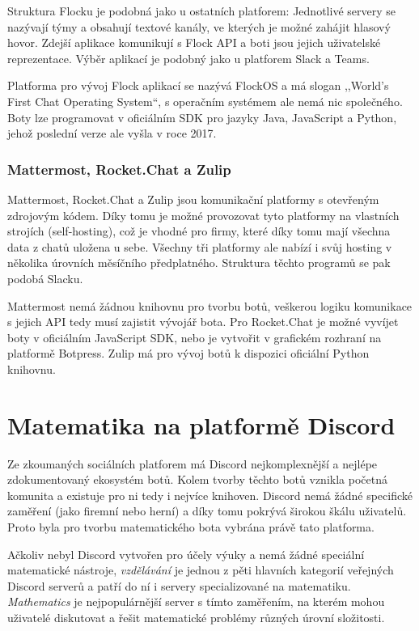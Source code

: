 \documentclass[FM]{tulthesis}
\begin{document}
	Struktura Flocku je podobná jako u ostatních platforem: Jednotlivé servery se nazývají týmy a obsahují textové kanály, ve kterých je možné zahájit hlasový hovor. Zdejší aplikace komunikují s Flock API a boti jsou jejich uživatelské reprezentace. Výběr aplikací je podobný jako u platforem Slack a Teams.
	
	Platforma pro vývoj Flock aplikací se nazývá FlockOS a má slogan ,,World's First Chat Operating System``, s operačním systémem ale nemá nic společného. Boty lze programovat v oficiálním SDK pro jazyky Java, JavaScript a Python, jehož poslední verze ale vyšla v roce 2017.
	
	\subsection{Mattermost, Rocket.Chat a Zulip}
	
	Mattermost, Rocket.Chat a Zulip jsou komunikační platformy s otevřeným zdrojovým kódem. Díky tomu je možné provozovat tyto platformy na vlastních strojích (self-hosting), což je vhodné pro firmy, které díky tomu mají všechna data z chatů uložena u sebe. Všechny tři platformy ale nabízí i svůj hosting v několika úrovních měsíčního předplatného. Struktura těchto programů se pak podobá Slacku.
	
	Mattermost nemá žádnou knihovnu pro tvorbu botů, veškerou logiku komunikace s jejich API tedy musí zajistit vývojář bota. Pro Rocket.Chat je možné vyvíjet boty v oficiálním JavaScript SDK, nebo je vytvořit v grafickém rozhraní na platformě Botpress. Zulip má pro vývoj botů k dispozici oficiální Python knihovnu.
		
	\chapter{Matematika na platformě Discord}\label{Chapter3}
	
	Ze zkoumaných sociálních platforem má Discord nejkomplexnější a nejlépe zdokumentovaný ekosystém botů. Kolem tvorby těchto botů vznikla početná komunita a existuje pro ni tedy i nejvíce knihoven. Discord nemá žádné specifické zaměření (jako firemní nebo herní) a díky tomu pokrývá širokou škálu uživatelů. Proto byla pro tvorbu matematického bota vybrána právě tato platforma.
	
	Ačkoliv nebyl Discord vytvořen pro účely výuky a nemá žádné speciální matematické nástroje, \textit{vzdělávání} je jednou z pěti hlavních kategorií veřejných Discord serverů a patří do ní i servery specializované na matematiku. \textit{Mathematics} je nejpopulárnější server s tímto zaměřením, na kterém mohou uživatelé diskutovat a řešit matematické problémy různých úrovní složitosti.
	
\end{document}
